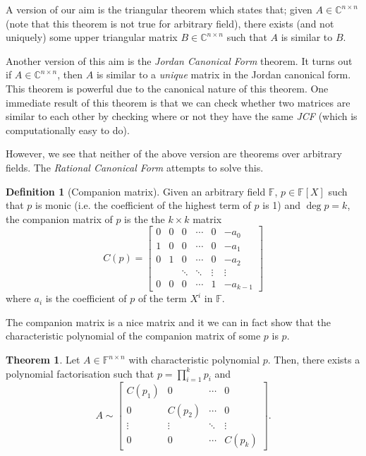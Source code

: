 \documentclass[
]{article}
\theoremstyle{definition}
\newtheorem{theorem}{Theorem}
\theoremstyle{definition}
\newtheorem{definition}{Definition}[section]
\begin{document}
A version of our aim is the triangular theorem which states that; given
\(A \in \mathbb{C}^{n \times n}\) (note that this theorem is not true
for arbitrary field), there exists (and not uniquely) some upper
triangular matrix \(B \in \mathbb{C}^{n \times n}\) such that \(A\) is
similar to \(B\).

Another version of this aim is the \emph{Jordan Canonical Form} theorem.
It turns out if \(A \in \mathbb{C}^{n \times n}\), then \(A\) is similar
to a \emph{unique} matrix in the Jordan canonical form. This theorem is
powerful due to the canonical nature of this theorem. One immediate
result of this theorem is that we can check whether two matrices are
similar to each other by checking where or not they have the same
\emph{JCF} (which is computationally easy to do).

However, we see that neither of the above version are theorems over
arbitrary fields. The \emph{Rational Canonical Form} attempts to solve
this.

\begin{definition} [Companion matrix]
  Given an arbitrary field \(\mathbb{F}\), \(p \in \mathbb{F}[X]\) such that 
  \(p\) is monic (i.e. the coefficient of the highest term of \(p\) is 1) and 
  \(\deg p = k\), the companion matrix of \(p\) is the the \(k \times k\) matrix 
  \[C(p) =
    \begin{bmatrix}
      0 & 0 & 0 & \cdots & 0 & -a_0 \\
      1 & 0 & 0 & \cdots & 0 & -a_1 \\
      0 & 1 & 0 & \cdots & 0 & -a_2 \\
       &  & \ddots & \ddots & \vdots & \vdots \\
      0 & 0 & 0 & \cdots & 1 & -a_{k - 1}
    \end{bmatrix}  
  \]
  where \(a_i\) is the coefficient of \(p\) of the term \(X^i\) in 
  \(\mathbb{F}\).
\end{definition}

The companion matrix is a nice matrix and it we can in fact show that
the characteristic polynomial of the companion matrix of some \(p\) is
\(p\).

\begin{theorem}
  Let \(A \in \mathbb{F}^{n \times n}\) with characteristic polynomial \(p\). 
  Then, there exists a polynomial factorisation such that 
  \(p = \prod_{i = 1}^k p_i\) and
  \[ A \sim
    \begin{bmatrix}
      C(p_1) & 0 & \cdots & 0 \\
      0 & C(p_2) & \cdots & 0 \\
      \vdots & \vdots & \ddots & \vdots \\
      0 & 0 & \cdots & C(p_k)
    \end{bmatrix}.
  \]
\end{theorem}
\end{document}
